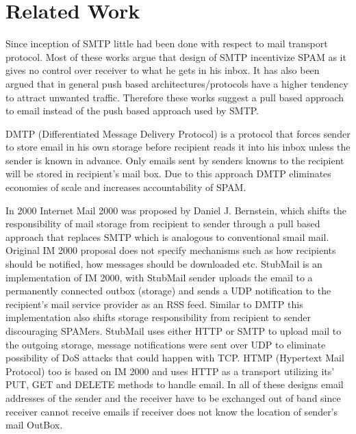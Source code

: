 \section{Related Work}

Since inception of SMTP little had been done with respect to mail transport
protocol. Most of these works argue that design of SMTP incentivize SPAM as it
gives no control over receiver to what he gets in his inbox. It has also been
argued that in general push based architectures/protocols have a higher tendency
to attract unwanted traffic\cite{PushVsPull}. Therefore these works suggest a
pull based approach to email instead of the push based approach used by SMTP. 

DMTP (Differentiated Message Delivery Protocol) \cite{dtmp} is a protocol that
forces sender to store email in his own storage before recipient reads it into
his inbox unless the sender is known in advance. Only emails sent by senders
knowns to the recipient will be stored in recipient's mail box. Due to this
approach DMTP eliminates economies of scale and increases accountability of
SPAM.

In 2000 Internet Mail 2000 \cite{im2k} was proposed by Daniel J. Bernstein,
which shifts the responsibility of mail storage from recipient to sender through
a pull based approach that replaces SMTP which is analogous to conventional
smail mail. Original IM 2000 proposal does not specify mechanisms such as how
recipients should be notified, how messages should be downloaded etc. StubMail
\cite{stubmail} is an implementation of IM 2000, with StubMail sender uploads
the email to a permanently connected outbox (storage) and sends a UDP
notification to the recipient’s mail service provider as an RSS feed. Similar to
DMTP this implementation also shifts storage responsibility from recipient to
sender discouraging SPAMers. StubMail uses either HTTP or SMTP to upload mail to
the outgoing storage, message notifications were sent over UDP to eliminate
possibility of DoS attacks that could happen with TCP. HTMP (Hypertext Mail
Protocol)\cite{htmp} too is based on IM 2000 and uses HTTP as a transport
utilizing its’ PUT, GET and DELETE methods to handle email. In all of these
designs email addresses of the sender and the receiver have to be exchanged out
of band since receiver cannot receive emails if receiver does not know the
location of sender’s mail OutBox.

